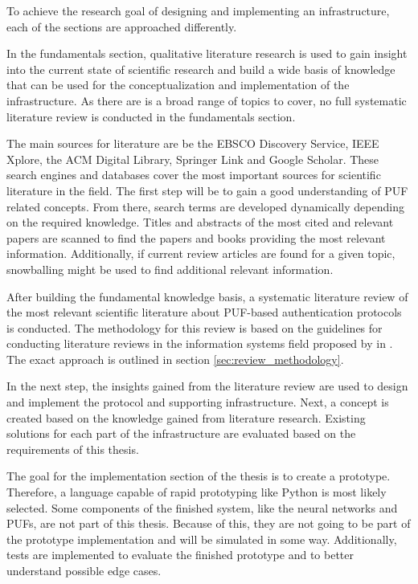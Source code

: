 To achieve the research goal of designing and implementing an infrastructure,
each of the sections are approached differently.

In the fundamentals section, qualitative literature research is used to gain insight into the current
state of scientific research and build a wide basis of knowledge that can be used for the conceptualization and implementation
of the infrastructure.
As there are is a broad range of topics to cover, no full systematic literature review is conducted in the fundamentals section.

The main sources for literature are be the EBSCO Discovery Service, IEEE Xplore, the ACM Digital Library, Springer Link and Google Scholar.
These search engines and databases cover the most important sources for scientific literature in the field.
The first step will be to gain a good understanding of \ac{PUF} related concepts.
From there, search terms are developed dynamically depending on the required knowledge.
Titles and abstracts of the most cited and relevant papers are scanned to find the papers
and books providing the most relevant information.
Additionally, if current review articles are found for a given topic,
snowballing might be used to find additional relevant information.

After building the fundamental knowledge basis, a systematic literature review of the most relevant scientific literature about
PUF-based authentication protocols is conducted.
The methodology for this review is based on the guidelines for conducting literature reviews in the information systems field
proposed by \citeauthor*{Brocke2009} in \cite{Brocke2009}. The exact approach is outlined in section \ref{sec:review_methodology}.

In the next step, the insights gained from the literature review are used to design and implement the protocol and supporting infrastructure.
Next, a concept is created based on the knowledge gained from literature research.
Existing solutions for each part of the infrastructure are evaluated based on the requirements of this thesis.

The goal for the implementation section of the thesis is to create a prototype.
Therefore, a language capable of rapid prototyping like Python is most likely
selected. Some components of the finished system, like the neural networks and \acp{PUF},
are not part of this thesis. Because of this, they are not going to be part of the prototype implementation and
will be simulated in some way. Additionally, tests are implemented to evaluate the finished prototype and to better understand
possible edge cases.

